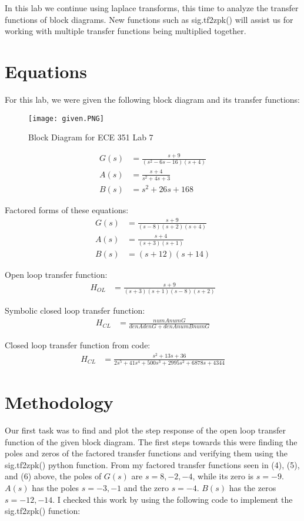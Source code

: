 \documentclass[12pt]{report}
\begin{document}
In this lab we continue using laplace transforms, this time to analyze the transfer functions of block diagrams. New functions such as sig.tf2zpk() will assist us for working with multiple transfer functions being multiplied together.

\section{Equations}

For this lab, we were given the following block diagram and its transfer functions:
\begin{figure}[H]
    \centering
    \texttt{[image: given.PNG]}
    \caption{Block Diagram for ECE 351 Lab 7}
\end{figure}

\begin{align}
    G(s) &= \frac{s+9}{(s^2-6s-16)(s+4)} \\
    A(s) &= \frac{s+4}{s^2+4s+3} \\
    B(s) &= s^2+26s+168 
\end{align}

Factored forms of these equations:
\begin{align}
    G(s) &= \frac{s+9}{(s-8)(s+2)(s+4)} \\
    A(s) &= \frac{s+4}{(s+3)(s+1)} \\
    B(s) &= (s+12)(s+14)
\end{align}

Open loop transfer function:
\begin{align}
    H_{OL} &= \frac{s+9}{(s+3)(s+1)(s-8)(s+2)}
\end{align}

Symbolic closed loop transfer function:
\begin{align}
    H_{CL} &= \frac{numAnumG}{denAdenG+denAnumBnumG}
\end{align}

Closed loop transfer function from code:
\begin{align}
    H_{CL} &= \frac{s^2+13s+36}{2s^5+41s^4+500s^3+2995s^2+6878s+4344}
\end{align}

 \section{Methodology}
 
 Our first task was to find and plot the step response of the open loop transfer function of the given block diagram. The first steps towards this were finding the poles and zeros of the factored transfer functions and verifying them using the sig.tf2zpk() python function. From my factored transfer functions seen in (4), (5), and (6) above, the poles of $G(s)$ are $s=8,-2,-4$, while its zero is $s=-9$. $A(s)$ has the poles $s=-3,-1$ and the zero $s=-4$. $B(s)$ has the zeros $s=-12,-14$. I checked this work by using the following code to implement the sig.tf2zpk() function:
 
\end{document}
